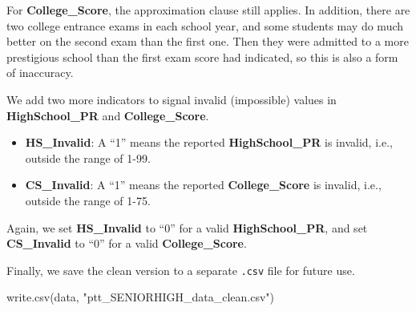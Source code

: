 \documentclass[
]{article}
\newenvironment{Shaded}{\begin{snugshade}}{\end{snugshade}}
\newcommand{\DecValTok}[1]{\textcolor[rgb]{0.00,0.00,0.81}{#1}}
\newcommand{\FunctionTok}[1]{\textcolor[rgb]{0.00,0.00,0.00}{#1}}
\newcommand{\NormalTok}[1]{#1}
\newcommand{\OtherTok}[1]{\textcolor[rgb]{0.56,0.35,0.01}{#1}}
\newcommand{\SpecialCharTok}[1]{\textcolor[rgb]{0.00,0.00,0.00}{#1}}
\newcommand{\StringTok}[1]{\textcolor[rgb]{0.31,0.60,0.02}{#1}}
\providecommand{\tightlist}{%
  \setlength{\itemsep}{0pt}\setlength{\parskip}{0pt}}
\begin{document}
For \textbf{College\_Score}, the approximation clause still applies. In
addition, there are two college entrance exams in each school year, and
some students may do much better on the second exam than the first one.
Then they were admitted to a more prestigious school than the first exam
score had indicated, so this is also a form of inaccuracy.

We add two more indicators to signal invalid (impossible) values in
\textbf{HighSchool\_PR} and \textbf{College\_Score}.

\begin{itemize}
\tightlist
\item
  \textbf{HS\_Invalid}: A ``1'' means the reported
  \textbf{HighSchool\_PR} is invalid, i.e., outside the range of 1-99.
\item
  \textbf{CS\_Invalid}: A ``1'' means the reported
  \textbf{College\_Score} is invalid, i.e., outside the range of 1-75.
\end{itemize}

Again, we set \textbf{HS\_Invalid} to ``0'' for a valid
\textbf{HighSchool\_PR}, and set \textbf{CS\_Invalid} to ``0'' for a
valid \textbf{College\_Score}.

\begin{Shaded}
\end{Shaded}

Finally, we save the clean version to a separate \texttt{.csv} file for
future use.

\begin{Shaded}
\begin{Highlighting}[]
\FunctionTok{write.csv}\NormalTok{(data, }\StringTok{"ptt\_SENIORHIGH\_data\_clean.csv"}\NormalTok{)}
\end{Highlighting}
\end{Shaded}
\end{document}
